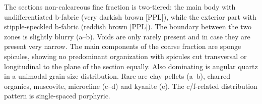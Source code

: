 \documentclass[a4paper]{article}
\begin{document}
\begin{multicols}{2}
\noindent The sections non-calcareous fine fraction is two-tiered: the main body with undifferentiated b-fabric (very darkish brown [PPL]), while the exterior part with stipple-speckled b-fabric (reddish brown [PPL]). The boundary between the two zones is slightly blurry (a--b). Voids are only rarely present and in case they are present very narrow. The main components of the coarse fraction are sponge spicules, showing no predominant organization with spicules cut transversal or longitudinal to the plane of the section equally. Also dominating is angular quartz in a unimodal grain-size distribution. Rare are clay pellets (a--b), charred organics, muscovite, microcline (c--d) and kyanite (e). The c/f-related distribution pattern is single-spaced porphyric.
\end{multicols}
\end{document}

